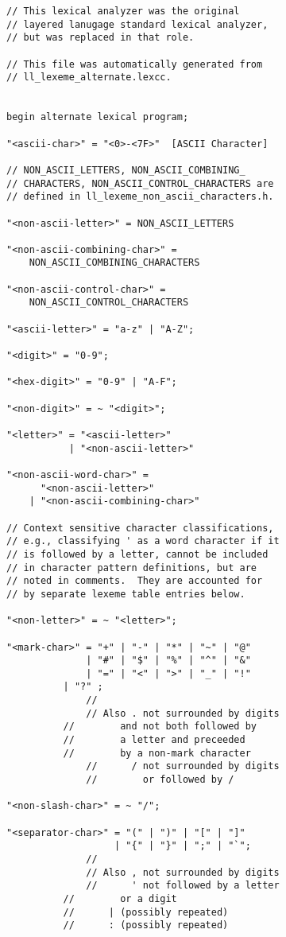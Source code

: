 \documentclass[12pt]{article}
\newenvironment{indpar}[1][0.3in]%
	{\begin{list}{}%
		     {\setlength{\itemsep}{0in}%
		      \setlength{\topsep}{0in}%
		      \setlength{\parsep}{1ex}%
		      \setlength{\labelwidth}{#1}%
		      \setlength{\leftmargin}{#1}%
		      \addtolength{\leftmargin}{\labelsep}}%
	 \item}%
	{\end{list}}
\begin{document}
\begin{indpar}
\begin{verbatim}
// This lexical analyzer was the original
// layered lanugage standard lexical analyzer,
// but was replaced in that role.

// This file was automatically generated from
// ll_lexeme_alternate.lexcc.


begin alternate lexical program;

"<ascii-char>" = "<0>-<7F>"  [ASCII Character]

// NON_ASCII_LETTERS, NON_ASCII_COMBINING_
// CHARACTERS, NON_ASCII_CONTROL_CHARACTERS are
// defined in ll_lexeme_non_ascii_characters.h.

"<non-ascii-letter>" = NON_ASCII_LETTERS

"<non-ascii-combining-char>" =
    NON_ASCII_COMBINING_CHARACTERS

"<non-ascii-control-char>" =
    NON_ASCII_CONTROL_CHARACTERS

"<ascii-letter>" = "a-z" | "A-Z";

"<digit>" = "0-9";

"<hex-digit>" = "0-9" | "A-F";

"<non-digit>" = ~ "<digit>";

"<letter>" = "<ascii-letter>"
           | "<non-ascii-letter>"

"<non-ascii-word-char>" =
      "<non-ascii-letter>"
    | "<non-ascii-combining-char>"

// Context sensitive character classifications,
// e.g., classifying ' as a word character if it
// is followed by a letter, cannot be included
// in character pattern definitions, but are
// noted in comments.  They are accounted for
// by separate lexeme table entries below.

"<non-letter>" = ~ "<letter>";

"<mark-char>" = "+" | "-" | "*" | "~" | "@"
              | "#" | "$" | "%" | "^" | "&"
              | "=" | "<" | ">" | "_" | "!"
	      | "?" ;
              //
              // Also . not surrounded by digits
	      //        and not both followed by
	      //        a letter and preceeded
	      //        by a non-mark character
              //      / not surrounded by digits
              //        or followed by /

"<non-slash-char>" = ~ "/";

"<separator-char>" = "(" | ")" | "[" | "]"
                   | "{" | "}" | ";" | "`";
              //
              // Also , not surrounded by digits
              //      ' not followed by a letter
	      //        or a digit
	      //      | (possibly repeated)
	      //      : (possibly repeated)


\end{verbatim}
\end{indpar}
\end{document}

